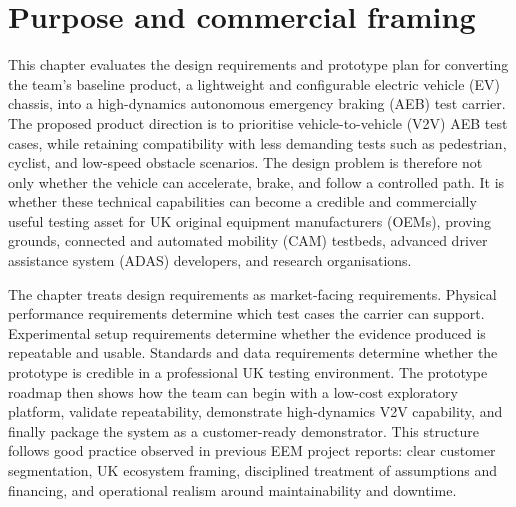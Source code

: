 

\section{Purpose and commercial framing}

This chapter evaluates the design requirements and prototype plan for converting the team's baseline product, a lightweight and configurable electric vehicle (EV) chassis, into a high-dynamics autonomous emergency braking (AEB) test carrier. The proposed product direction is to prioritise vehicle-to-vehicle (V2V) AEB test cases, while retaining compatibility with less demanding tests such as pedestrian, cyclist, and low-speed obstacle scenarios. The design problem is therefore not only whether the vehicle can accelerate, brake, and follow a controlled path. It is whether these technical capabilities can become a credible and commercially useful testing asset for UK original equipment manufacturers (OEMs), proving grounds, connected and automated mobility (CAM) testbeds, advanced driver assistance system (ADAS) developers, and research organisations.

The chapter treats design requirements as market-facing requirements. Physical performance requirements determine which test cases the carrier can support. Experimental setup requirements determine whether the evidence produced is repeatable and usable. Standards and data requirements determine whether the prototype is credible in a professional UK testing environment. The prototype roadmap then shows how the team can begin with a low-cost exploratory platform, validate repeatability, demonstrate high-dynamics V2V capability, and finally package the system as a customer-ready demonstrator. This structure follows good practice observed in previous EEM project reports: clear customer segmentation, UK ecosystem framing, disciplined treatment of assumptions and financing, and operational realism around maintainability and downtime.

